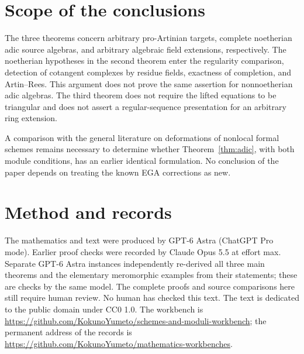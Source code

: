 \documentclass[11pt]{article}
\theoremstyle{definition}\newtheorem{definition}[theorem]{Definition}
\theoremstyle{remark}\newtheorem{remark}[theorem]{Remark}
\newcommand{\workbenchurl}{https://github.com/KokunoYumeto/schemes-and-moduli-workbench}
\newcommand{\recordurl}{https://github.com/KokunoYumeto/mathematics-workbenches}
\begin{document}
\section{Scope of the conclusions}

The three theorems concern arbitrary pro-Artinian targets, complete noetherian adic source algebras, and arbitrary algebraic field extensions, respectively. The noetherian hypotheses in the second theorem enter the regularity comparison, detection of cotangent complexes by residue fields, exactness of completion, and Artin--Rees. This argument does not prove the same assertion for nonnoetherian adic algebras. The third theorem does not require the lifted equations to be triangular and does not assert a regular-sequence presentation for an arbitrary ring extension.

A comparison with the general literature on deformations of nonlocal formal schemes remains necessary to determine whether Theorem~\ref{thm:adic}, with both module conditions, has an earlier identical formulation. No conclusion of the paper depends on treating the known EGA corrections as new.

\section*{Method and records}

The mathematics and text were produced by GPT-6 Astra (ChatGPT Pro mode). Earlier proof checks were recorded by Claude Opus 5.5 at effort max. Separate GPT-6 Astra instances independently re-derived all three main theorems and the elementary meromorphic examples from their statements; these are checks by the same model. The complete proofs and source comparisons here still require human review. No human has checked this text. The text is dedicated to the public domain under CC0 1.0. The workbench is \url{\workbenchurl}; the permanent address of the records is \url{\recordurl}.
\end{document}
